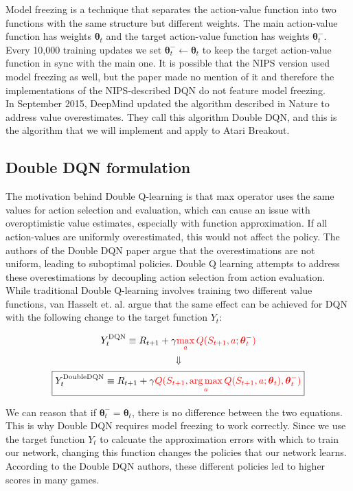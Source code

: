\documentclass{article}
\DeclareMathOperator*{\argmax}{arg\,max}
\begin{document}
Model freezing is a technique that separates the action-value function into two functions with the same structure but different weights. The main action-value function has weights $\boldsymbol{\theta}_t$ and the target action-value function has weights $\boldsymbol{\theta}_t^-$. Every 10,000 training updates we set $\boldsymbol{\theta}_t^- \leftarrow \boldsymbol{\theta}_t$ to keep the target action-value function in sync with the main one. It is possible that the NIPS version used model freezing as well, but the paper made no mention of it and therefore the implementations of the NIPS-described DQN do not feature model freezing. \\

In September 2015, DeepMind updated the algorithm described in Nature to address value overestimates. They call this algorithm Double DQN, and this is the algorithm that we will implement and apply to Atari Breakout.

\subsection{Double DQN formulation}
  The motivation behind Double Q-learning is that max operator uses the same values for action selection and evaluation, which can cause an issue with overoptimistic value estimates, especially with function approximation. If all action-values are uniformly overestimated, this would not affect the policy. The authors of the Double DQN paper argue that the overestimations are not uniform, leading to suboptimal policies. Double Q learning attempts to address these overestimations by decoupling action selection from action evaluation. While traditional Double Q-learning involves training two different value functions, van Hasselt et. al. argue that the same effect can be achieved for DQN with the following change to the target function $Y_t$:

  \[Y_t^{\textrm{DQN}} \equiv R_{t+1} + \gamma \textcolor{red}{\max_{a} Q(S_{t+1},a;\boldsymbol{\theta}_t^-)} \]
  \[ \Downarrow \]
  \[\boxed{Y_t^{\textrm{DoubleDQN}} \equiv R_{t+1} + \gamma \textcolor{red}{Q(S_{t+1},\argmax_a Q(S_{t+1},a;\boldsymbol{\theta}_t),\boldsymbol{\theta}_t^-)}} \]

  We can reason that if $\boldsymbol{\theta}_t^- = \boldsymbol{\theta}_t$, there is no difference between the two equations. This is why Double DQN requires model freezing to work correctly. Since we use the target function $Y_t$ to calcuate the approximation errors with which to train our network, changing this function changes the policies that our network learns. According to the Double DQN authors, these different policies led to higher scores in many games.
\end{document}

